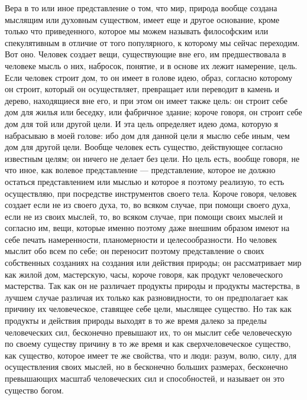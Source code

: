 \documentclass[12pt]{article}
\begin{document}
Вера в то или иное представление о том, что мир, природа вообще создана мыслящим или духовным существом, имеет еще и другое основание, кроме только что приведенного, которое мы можем называть философским или спекулятивным в отличие от того популярного, к которому мы сейчас переходим. Вот оно. Человек создает вещи, существующие вне его, им предшествовала в человеке мысль о них, набросок, понятие, и в основе их лежит намерение, цель. Если человек строит дом, то он имеет в голове идею, образ, согласно которому он строит, который он осуществляет, превращает или переводит в камень и дерево, находящиеся вне его, и при этом он имеет также цель: он строит себе дом для жилья или беседку, или фабричное здание; короче говоря, он строит себе дом для той или другой цели. И эта цель определяет идею дома, которую я набрасываю в моей голове: ибо дом для данной цели я мыслю себе иным, чем дом для другой цели. Вообще человек есть существо, действующее согласно известным целям; он ничего не делает без цели. Но цель есть, вообще говоря, не что иное, как волевое представление --- представление, которое не должно остаться представлением или мыслью и которое я поэтому реализую, то есть осуществляю, при посредстве инструментов своего тела. Короче говоря, человек создает если не из своего духа, то, во всяком случае, при помощи своего духа, если не из своих мыслей, то, во всяком случае, при помощи своих мыслей и согласно им, вещи, которые именно поэтому даже внешним образом имеют на себе печать намеренности, планомерности и целесообразности. Но человек мыслит обо всем по себе; он переносит поэтому представление о своих собственных созданиях на создания или действия природы; он рассматривает мир как жилой дом, мастерскую, часы, короче говоря, как продукт человеческого мастерства. Так как он не различает продукты природы и продукты мастерства, в лучшем случае различая их только как разновидности, то он предполагает как причину их человеческое, ставящее себе цели, мыслящее существо. Но так как продукты и действия природы выходят в то же время далеко за пределы человеческих сил, бесконечно превышают их, то он мыслит себе человеческую по своему существу причину в то же время и как сверхчеловеческое существо, как существо, которое имеет те же свойства, что и люди: разум, волю, силу, для осуществления своих мыслей, но в бесконечно больших размерах, бесконечно превышающих масштаб человеческих сил и способностей, и называет он это существо богом. 
\end{document}
